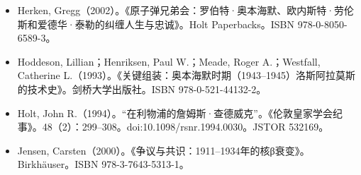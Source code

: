 \begin{itemize}
\item Herken, Gregg（2002）。《原子弹兄弟会：罗伯特·奥本海默、欧内斯特·劳伦斯和爱德华·泰勒的纠缠人生与忠诚》。Holt Paperbacks。ISBN 978-0-8050-6589-3。
\item Hoddeson, Lillian；Henriksen, Paul W.；Meade, Roger A.；Westfall, Catherine L.（1993）。《关键组装：奥本海默时期（1943–1945）洛斯阿拉莫斯的技术史》。剑桥大学出版社。ISBN 978-0-521-44132-2。
\item Holt, John R.（1994）。“在利物浦的詹姆斯·查德威克”。《伦敦皇家学会纪事》。48（2）：299–308。doi:10.1098/rsnr.1994.0030。JSTOR 532169。
\item Jensen, Carsten（2000）。《争议与共识：1911–1934年的核β衰变》。Birkhäuser。ISBN 978-3-7643-5313-1。


\end{itemize}